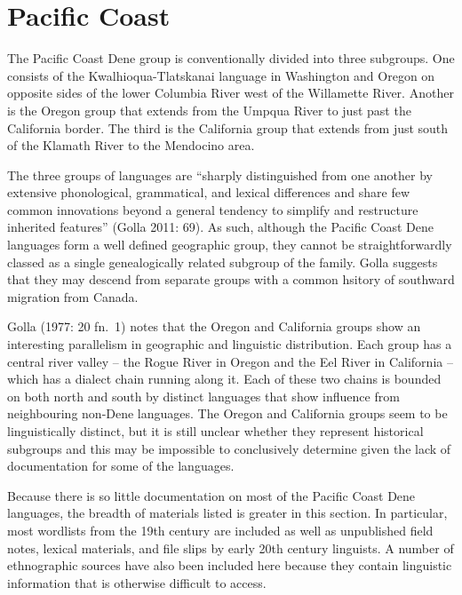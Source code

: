 \documentclass[12pt,letterpaper,oneside,article]{memoir}
\begin{document}
\section{Pacific Coast}\label{sec:pacific}

The Pacific Coast Dene group is conventionally divided into three subgroups.
One consists of the Kwalhioqua-Tlatskanai language in Washington and Oregon on opposite sides of the lower Columbia River west of the Willamette River.
Another is the Oregon group that extends from the Umpqua River to just past the California border.
The third is the California group that extends from just south of the Klamath River to the Mendocino area.

The three groups of languages are “sharply distinguished from one another by extensive phonological, grammatical, and lexical differences and share few common innovations beyond a general tendency to simplify and restructure inherited features” (Golla 2011: 69).
As such, although the Pacific Coast Dene languages form a well defined geographic group, they cannot be straightforwardly classed as a single genealogically related subgroup of the family.
Golla suggests that they may descend from separate groups with a common hsitory of southward migration from Canada.

Golla (1977: 20 fn.\ 1) notes that the Oregon and California groups show an interesting parallelism in geographic and linguistic distribution.
Each group has a central river valley – the Rogue River in Oregon and the Eel River in California – which has a dialect chain running along it.
Each of these two chains is bounded on both north and south by distinct languages that show influence from neighbouring non-Dene languages.
The Oregon and California groups seem to be linguistically distinct, but it is still unclear whether they represent historical subgroups and this may be impossible to conclusively determine given the lack of documentation for some of the languages.

Because there is so little documentation on most of the Pacific Coast Dene languages, the breadth of materials listed is greater in this section.
In particular, most wordlists from the 19th century are included as well as unpublished field notes, lexical materials, and file slips by early 20th century linguists.
A number of ethnographic sources have also been included here because they contain linguistic information that is otherwise difficult to access.
\end{document}
